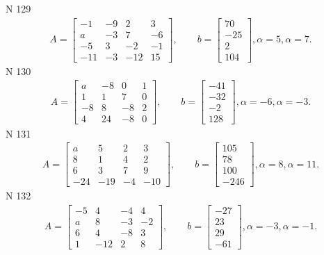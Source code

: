 \documentclass[11pt]{report}
\begin{document}
N 129
\begin{align*}
 A = \left[\begin{matrix}-1 & -9 & 2 & 3\\a & -3 & 7 & -6\\-5 & 3 & -2 & -1\\-11 & -3 & -12 & 15\end{matrix}\right],
    \qquad b = \left[\begin{matrix}70\\-25\\2\\104\end{matrix}\right], \alpha = 5, \alpha = 7. 
 \end{align*}
N 130
\begin{align*}
 A = \left[\begin{matrix}a & -8 & 0 & 1\\1 & 1 & 7 & 0\\-8 & 8 & -8 & 2\\4 & 24 & -8 & 0\end{matrix}\right],
    \qquad b = \left[\begin{matrix}-41\\-32\\-2\\128\end{matrix}\right], \alpha = -6, \alpha = -3. 
 \end{align*}
N 131
\begin{align*}
 A = \left[\begin{matrix}a & 5 & 2 & 3\\8 & 1 & 4 & 2\\6 & 3 & 7 & 9\\-24 & -19 & -4 & -10\end{matrix}\right],
    \qquad b = \left[\begin{matrix}105\\78\\100\\-246\end{matrix}\right], \alpha = 8, \alpha = 11. 
 \end{align*}
N 132
\begin{align*}
 A = \left[\begin{matrix}-5 & 4 & -4 & 4\\a & 8 & -3 & -2\\6 & 4 & -8 & 3\\1 & -12 & 2 & 8\end{matrix}\right],
    \qquad b = \left[\begin{matrix}-27\\23\\29\\-61\end{matrix}\right], \alpha = -3, \alpha = -1. 
 \end{align*}
\end{document}
